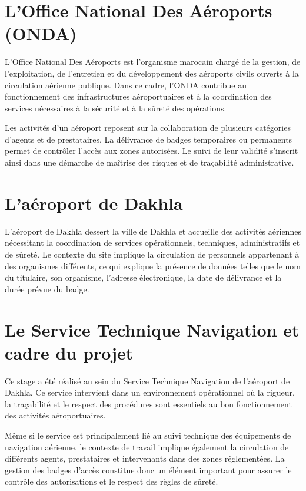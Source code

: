 \documentclass[12pt,a4paper,openany]{report}
\begin{document}
\section{L'Office National Des Aéroports (ONDA)}

L'Office National Des Aéroports est l'organisme marocain chargé de la gestion,
de l'exploitation, de l'entretien et du développement des aéroports civils
ouverts à la circulation aérienne publique. Dans ce cadre, l'ONDA contribue au
fonctionnement des infrastructures aéroportuaires et à la coordination des
services nécessaires à la sécurité et à la sûreté des opérations.

Les activités d'un aéroport reposent sur la collaboration de plusieurs
catégories d'agents et de prestataires. La délivrance de badges temporaires ou
permanents permet de contrôler l'accès aux zones autorisées. Le suivi de leur
validité s'inscrit ainsi dans une démarche de maîtrise des risques et de
traçabilité administrative.

\section{L'aéroport de Dakhla}

L'aéroport de Dakhla dessert la ville de Dakhla et accueille des activités
aériennes nécessitant la coordination de services opérationnels, techniques,
administratifs et de sûreté. Le contexte du site implique la circulation de
personnels appartenant à des organismes différents, ce qui explique la présence
de données telles que le nom du titulaire, son organisme, l'adresse électronique,
la date de délivrance et la durée prévue du badge.

\section{Le Service Technique Navigation et cadre du projet}

Ce stage a été réalisé au sein du Service Technique Navigation de l'aéroport de
Dakhla. Ce service intervient dans un environnement opérationnel où la rigueur,
la traçabilité et le respect des procédures sont essentiels au bon fonctionnement
des activités aéroportuaires.

Même si le service est principalement lié au suivi technique des équipements de
navigation aérienne, le contexte de travail implique également la circulation de
différents agents, prestataires et intervenants dans des zones réglementées. La
gestion des badges d'accès constitue donc un élément important pour assurer le
contrôle des autorisations et le respect des règles de sûreté.
\end{document}
